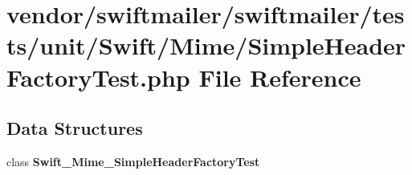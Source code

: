 \section{vendor/swiftmailer/swiftmailer/tests/unit/\+Swift/\+Mime/\+Simple\+Header\+Factory\+Test.php File Reference}
\label{_simple_header_factory_test_8php}
\subsection*{Data Structures}
\begin{DoxyCompactItemize}
\item 
class {\bf Swift\+\_\+\+Mime\+\_\+\+Simple\+Header\+Factory\+Test}
\end{DoxyCompactItemize}
